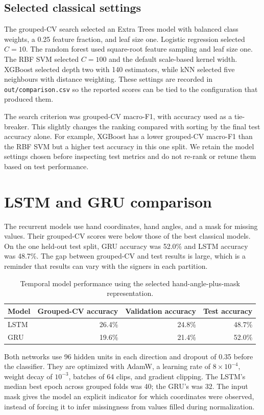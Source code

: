 \documentclass[12pt,a4paper,oneside]{report}
\begin{document}
\subsection{Selected classical settings}
The grouped-CV search selected an Extra Trees model with balanced class weights, a 0.25 feature fraction, and leaf size one. Logistic regression selected $C=10$. The random forest used square-root feature sampling and leaf size one. The RBF SVM selected $C=100$ and the default scale-based kernel width. XGBoost selected depth two with 140 estimators, while kNN selected five neighbours with distance weighting. These settings are recorded in \texttt{out/comparison.csv} so the reported scores can be tied to the configuration that produced them.

The search criterion was grouped-CV macro-F1, with accuracy used as a tie-breaker. This slightly changes the ranking compared with sorting by the final test accuracy alone. For example, XGBoost has a lower grouped-CV macro-F1 than the RBF SVM but a higher test accuracy in this one split. We retain the model settings chosen before inspecting test metrics and do not re-rank or retune them based on test performance.

\section{LSTM and GRU comparison}
The recurrent models use hand coordinates, hand angles, and a mask for missing values. Their grouped-CV scores were below those of the best classical models. On the one held-out test split, GRU accuracy was 52.0\% and LSTM accuracy was 48.7\%. The gap between grouped-CV and test results is large, which is a reminder that results can vary with the signers in each partition.

\begin{table}[H]
\centering
\label{tab:temporal}
\begin{tabular}{lrrr}
\toprule
Model & Grouped-CV accuracy & Validation accuracy & Test accuracy \\
\midrule
LSTM & 26.4\% & 24.8\% & 48.7\% \\
GRU & 19.6\% & 21.4\% & 52.0\% \\
\bottomrule
\end{tabular}
\caption{Temporal model performance using the selected hand-angle-plus-mask representation.}
\end{table}

Both networks use 96 hidden units in each direction and dropout of 0.35 before the classifier. They are optimized with AdamW, a learning rate of $8\times10^{-4}$, weight decay of $10^{-3}$, batches of 64 clips, and gradient clipping. The LSTM's median best epoch across grouped folds was 40; the GRU's was 32. The input mask gives the model an explicit indicator for which coordinates were observed, instead of forcing it to infer missingness from values filled during normalization.
\end{document}
